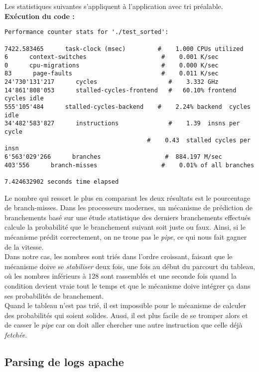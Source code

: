 Les statistiques suivantes s'appliquent à l'application avec tri préalable.\\
\textbf{Exécution du code : } \\
\begin{lstlisting}
Performance counter stats for './test_sorted':

7422.583465      task-clock (msec)         #    1.000 CPUs utilized          
6      context-switches          			#    0.001 K/sec                  
0      cpu-migrations            			#    0.000 K/sec                  
83      page-faults               			#    0.011 K/sec                  
24'730'131'217      cycles                    #    3.332 GHz                    
14'861'808'053      stalled-cycles-frontend   #   60.10% frontend cycles idle   
555'105'484      stalled-cycles-backend    #    2.24% backend  cycles idle   
34'482'583'827      instructions              #    1.39  insns per cycle        
										#    0.43  stalled cycles per insn
6'563'029'266      branches                  #  884.197 M/sec                  
403'556      branch-misses             		#    0.01% of all branches        

7.424632902 seconds time elapsed
\end{lstlisting}
Le nombre qui ressort le plus en comparant les deux résultats est le pourcentage de branch-misses. Dans les processeurs modernes, un mécanisme de prédiction de branchements basé sur une étude statistique des derniers branchements effectués calcule la probabilité que le branchement suivant soit juste ou faux. Ainsi, si le mécanisme prédit correctement, on ne troue pas le \textit{pipe}, ce qui nous fait gagner de la vitesse.\\
Dans notre cas, les nombres sont triés dans l'ordre croissant, faisant que le mécanisme doive se \textit{stabiliser} deux fois, une fois au début du parcourt du tableau, où les nombres inférieurs à 128 sont rassemblés et une seconde fois quand la condition devient vraie tout le temps et que le mécanisme doive intégrer ça dans ses probabilités de branchement.\\
Quand le tableau n'est pas trié, il est impossible pour le mécanisme de calculer des probabilités qui soient solides. Aussi, il est plus facile de se tromper alors et de casser le \textit{pipe} car on doit aller chercher une autre instruction que celle déjà \textit{fetchée}.

\subsection{Parsing de logs apache}
